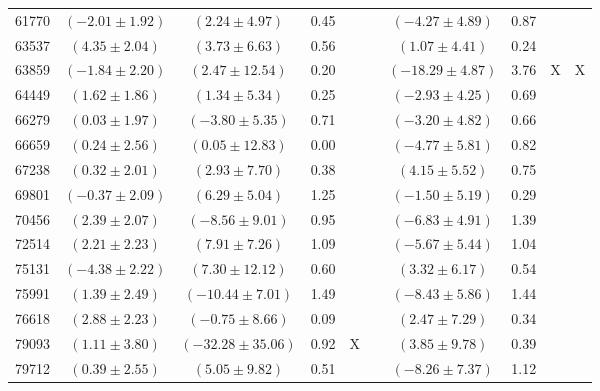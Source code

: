 \documentclass [10pt, twoside] {uwthesis}[2012/04/02]
\begin{document}
{\begin{longtable}[t]{|c|c|cccc|cccc|}
61770	&  $(	-2.01	  \pm  	1.92	)$  &  $(	2.24	  \pm  	4.97	)$  &  	0.45	  &  		  &  		  &  $(	-4.27	  \pm  	4.89	)$  &  	0.87	  &  		  &  		  \\
63537	&  $(	4.35	  \pm  	2.04	)$  &  $(	3.73	  \pm  	6.63	)$  &  	0.56	  &  		  &  		  &  $(	1.07	  \pm  	4.41	)$  &  	0.24	  &  		  &  		  \\
63859	&  $(	-1.84	  \pm  	2.20	)$  &  $(	2.47	  \pm  	12.54	)$  &  	0.20	  &  		  &  		  &  $(	-18.29	  \pm  	4.87	)$  &  	3.76	  &  	X	  &  	X	  \\
64449	&  $(	1.62	  \pm  	1.86	)$  &  $(	1.34	  \pm  	5.34	)$  &  	0.25	  &  		  &  		  &  $(	-2.93	  \pm  	4.25	)$  &  	0.69	  &  		  &  		  \\
66279	&  $(	0.03	  \pm  	1.97	)$  &  $(	-3.80	  \pm  	5.35	)$  &  	0.71	  &  		  &  		  &  $(	-3.20	  \pm  	4.82	)$  &  	0.66	  &  		  &  		  \\
66659	&  $(	0.24	  \pm  	2.56	)$  &  $(	0.05	  \pm  	12.83	)$  &  	0.00	  &  		  &  		  &  $(	-4.77	  \pm  	5.81	)$  &  	0.82	  &  		  &  		  \\
67238	&  $(	0.32	  \pm  	2.01	)$  &  $(	2.93	  \pm  	7.70	)$  &  	0.38	  &  		  &  		  &  $(	4.15	  \pm  	5.52	)$  &  	0.75	  &  		  &  		  \\
69801	&  $(	-0.37	  \pm  	2.09	)$  &  $(	6.29	  \pm  	5.04	)$  &  	1.25	  &  		  &  		  &  $(	-1.50	  \pm  	5.19	)$  &  	0.29	  &  		  &  		  \\
70456	&  $(	2.39	  \pm  	2.07	)$  &  $(	-8.56	  \pm  	9.01	)$  &  	0.95	  &  		  &  		  &  $(	-6.83	  \pm  	4.91	)$  &  	1.39	  &  		  &  		  \\
72514	&  $(	2.21	  \pm  	2.23	)$  &  $(	7.91	  \pm  	7.26	)$  &  	1.09	  &  		  &  		  &  $(	-5.67	  \pm  	5.44	)$  &  	1.04	  &  		  &  		  \\
75131	&  $(	-4.38	  \pm  	2.22	)$  &  $(	7.30	  \pm  	12.12	)$  &  	0.60	  &  		  &  		  &  $(	3.32	  \pm  	6.17	)$  &  	0.54	  &  		  &  		  \\
75991	&  $(	1.39	  \pm  	2.49	)$  &  $(	-10.44	  \pm  	7.01	)$  &  	1.49	  &  		  &  		  &  $(	-8.43	  \pm  	5.86	)$  &  	1.44	  &  		  &  		  \\
76618	&  $(	2.88	  \pm  	2.23	)$  &  $(	-0.75	  \pm  	8.66	)$  &  	0.09	  &  		  &  		  &  $(	2.47	  \pm  	7.29	)$  &  	0.34	  &  		  &  		  \\
79093	&  $(	1.11	  \pm  	3.80	)$  &  $(	-32.28	  \pm  	35.06	)$  &  	0.92	  &  	X	  &  		  &  $(	3.85	  \pm  	9.78	)$  &  	0.39	  &  		  &  		  \\
79712	&  $(	0.39	  \pm  	2.55	)$  &  $(	5.05	  \pm  	9.82	)$  &  	0.51	  &  		  &  		  &  $(	-8.26	  \pm  	7.37	)$  &  	1.12	  &  		  &  		  \\

\end{longtable}}
\end{document}
